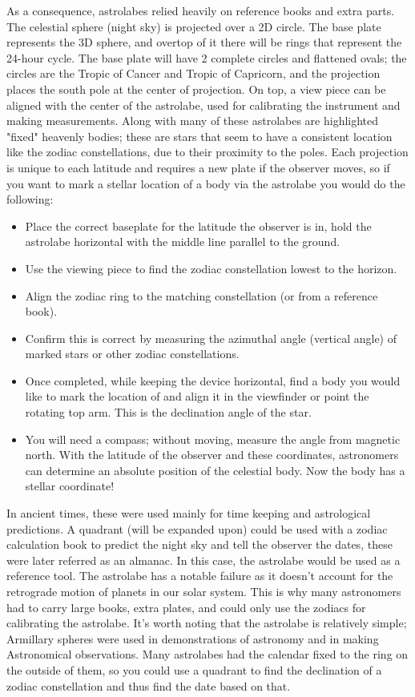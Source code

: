 \documentclass[12pt,oneside,a4paper,english]{article}
\begin{document}
As a consequence, astrolabes relied heavily on reference books and extra parts. The celestial sphere (night sky) is projected over a 2D circle. The base plate represents the 3D sphere, and overtop of it there will be rings that represent the 24-hour cycle. The base plate will have 2 complete circles and flattened ovals; the circles are the Tropic of Cancer and Tropic of Capricorn, and the projection places the south pole at the center of projection. 
On top, a view piece can be aligned with the center of the astrolabe, used for calibrating the instrument and making measurements. Along with many of these astrolabes are highlighted "fixed" heavenly bodies; these are stars that seem to have a consistent location like the zodiac constellations, due to their proximity to the poles. Each projection is unique to each latitude and requires a new plate if the observer moves, so if you want to mark a stellar location of a body via the astrolabe you would do the following:
\begin{itemize}
\item Place the correct baseplate for the latitude the observer is in, hold the astrolabe horizontal with the middle line parallel to the ground.
\item Use the viewing piece to find the zodiac constellation lowest to the horizon.
\item Align the zodiac ring to the matching constellation (or from a reference book).
\item Confirm this is correct by measuring the azimuthal angle (vertical angle) of marked stars or other zodiac constellations.
\item Once completed, while keeping the device horizontal, find a body you would like to mark the location of and align it in the viewfinder or point the rotating top arm. This is the declination angle of the star.
\item You will need a compass; without moving, measure the angle from magnetic north. With the latitude of the observer and these coordinates, astronomers can determine an absolute position of the celestial body. Now the body has a stellar coordinate!
\end{itemize}
In ancient times, these were used mainly for time keeping and astrological predictions. A quadrant (will be expanded upon) could be used with a zodiac calculation book to predict the night sky and tell the observer the dates, these were later referred as an almanac. In this case, the astrolabe would be used as a reference tool. The astrolabe has a notable failure as it doesn't account for the retrograde motion of planets in our solar system. This is why many astronomers had to carry large books, extra plates, and could only use the zodiacs for calibrating the astrolabe. It's worth noting that the astrolabe is relatively simple; Armillary spheres were used in demonstrations of astronomy and in making Astronomical observations. Many astrolabes had the calendar fixed to the ring on the outside of them, so you could use a quadrant to find the declination of a zodiac constellation and thus find the date based on that.
\end{document}
